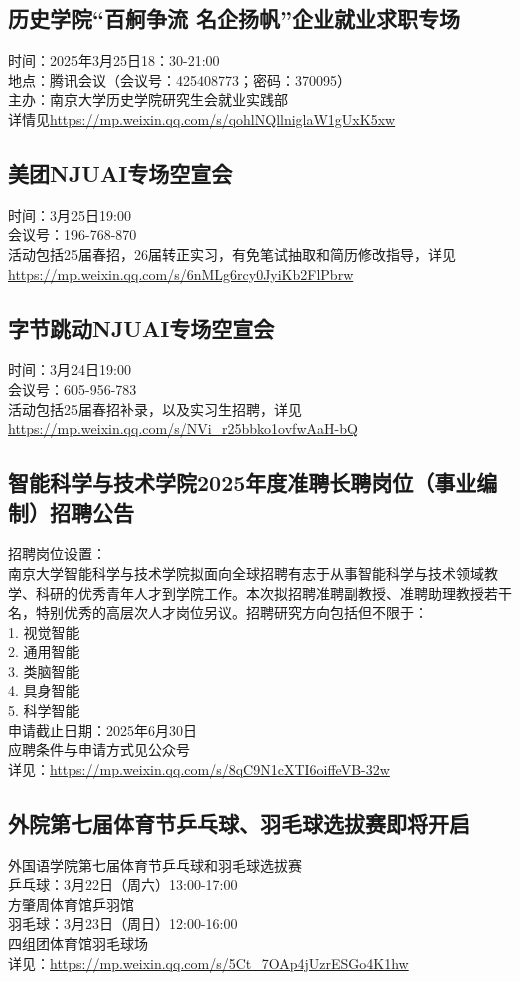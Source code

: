 \documentclass[letterpaper, 12pt]{article}
\begin{document}
\begin{multicols}{2}
\section{历史学院“百舸争流 名企扬帆”企业就业求职专场}
时间：2025年3月25日18：30-21:00\\
地点：腾讯会议（会议号：425408773；密码：370095）\\
主办：南京大学历史学院研究生会就业实践部\\
详情见\url{https://mp.weixin.qq.com/s/qohlNQllniglaW1gUxK5xw}

\subsection{美团NJUAI专场空宣会}
时间：3月25日19:00\\
会议号：196-768-870\\
活动包括25届春招，26届转正实习，有免笔试抽取和简历修改指导，详见\url{https://mp.weixin.qq.com/s/6nMLg6rcy0JyiKb2FlPbrw}

\subsection{字节跳动NJUAI专场空宣会}
时间：3月24日19:00\\
会议号：605-956-783\\
活动包括25届春招补录，以及实习生招聘，详见\url{https://mp.weixin.qq.com/s/NVi_r25bbko1ovfwAaH-bQ}

\subsection{智能科学与技术学院2025年度准聘长聘岗位（事业编制）招聘公告}
招聘岗位设置：
\\南京大学智能科学与技术学院拟面向全球招聘有志于从事智能科学与技术领域教学、科研的优秀青年人才到学院工作。本次拟招聘准聘副教授、准聘助理教授若干名，特别优秀的高层次人才岗位另议。招聘研究方向包括但不限于：
\\1.  视觉智能
\\2.  通用智能
\\3.  类脑智能
\\4.  具身智能
\\5.  科学智能
\\申请截止日期：2025年6月30日
\\应聘条件与申请方式见公众号
\\详见：\url{https://mp.weixin.qq.com/s/8qC9N1cXTI6oiffeVB-32w}

\subsection{外院第七届体育节乒乓球、羽毛球选拔赛即将开启}
外国语学院第七届体育节乒乓球和羽毛球选拔赛
\\乒乓球：3月22日（周六）13:00-17:00 
\\方肇周体育馆乒羽馆
\\羽毛球：3月23日（周日）12:00-16:00
\\四组团体育馆羽毛球场
\\详见：\url{https://mp.weixin.qq.com/s/5Ct_7OAp4jUzrESGo4K1hw}


\end{multicols}
\end{document}
